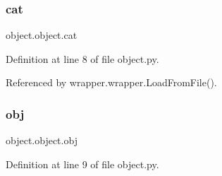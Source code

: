 \subsubsection{\texorpdfstring{cat}{cat}}
{\footnotesize\ttfamily object.\+object.\+cat}



Definition at line 8 of file object.\+py.



Referenced by wrapper.\+wrapper.\+Load\+From\+File().

\mbox{\label{classobject_1_1object_a82b61e7cd7e18b1f9de10fc832e5b75e}} 
\subsubsection{\texorpdfstring{obj}{obj}}
{\footnotesize\ttfamily object.\+object.\+obj}



Definition at line 9 of file object.\+py.



